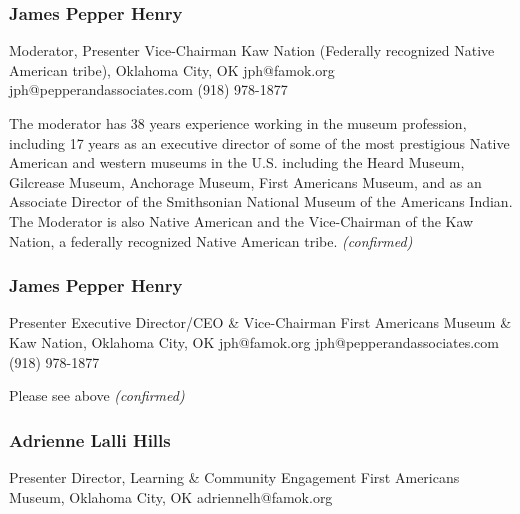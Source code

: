 \documentclass{report}
\begin{document}
              
                \subsubsection*{ James Pepper Henry }
                Moderator, Presenter\newline
                Vice-Chairman\newline
                Kaw Nation (Federally recognized Native American tribe), Oklahoma City, OK
                \newline
                jph@famok.org\newline
                jph@pepperandassociates.com\newline
                (918) 978-1877\newline

                The moderator has 38 years experience working in the museum profession, including 17 years as an executive director of some of the most prestigious Native American and western museums in the U.S. including the Heard Museum, Gilcrease Museum, Anchorage Museum, First Americans Museum, and as an Associate Director of the Smithsonian National Museum of the Americans Indian.  The Moderator is also Native American and the Vice-Chairman of the Kaw Nation, a federally recognized Native American tribe.\newline
                \emph{ (confirmed) }
              

              
                \subsubsection*{ James Pepper Henry }
                Presenter\newline
                Executive Director/CEO \& Vice-Chairman\newline
                First Americans Museum \& Kaw Nation, Oklahoma City, OK
                \newline
                jph@famok.org\newline
                jph@pepperandassociates.com\newline
                (918) 978-1877\newline

                Please see above
                \emph{ (confirmed) }
              

              
                \subsubsection*{ Adrienne Lalli Hills }
                Presenter\newline
                Director, Learning \& Community Engagement\newline
                First Americans Museum, Oklahoma City, OK
                \newline
                adriennelh@famok.org\newline
                
\end{document}
